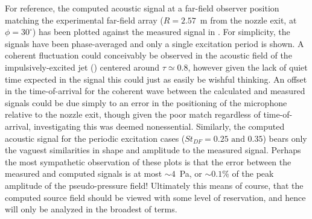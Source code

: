 For reference, the computed acoustic signal at a far-field observer position matching the experimental far-field array ($R = 2.57$~m from the nozzle exit, at $\phi = 30^\circ$) has been plotted against the measured signal in .
For simplicity, the signals have been phase-averaged and only a single excitation period is shown.
A coherent fluctuation could conceivably be observed in the acoustic field of the impulsively-excited jet () centered around $\tau \simeq 0.8$, however given the lack of quiet time expected in the signal this could just as easily be wishful thinking.
An offset in the time-of-arrival for the coherent wave between the calculated and measured signals could be due simply to an error in the positioning of the microphone relative to the nozzle exit, though given the poor match regardless of time-of-arrival, investigating this was deemed nonessential.
Similarly, the computed acoustic signal for the periodic excitation cases ($St_{DF} = 0.25 \text{ and } 0.35$) bears only the vaguest similarities in shape and amplitude to the measured signal.
Perhaps the most sympathetic observation of these plots is that the error between the measured and computed signals is at most $\sim 4$~Pa, or $\sim 0.1$\% of the peak amplitude of the pseudo-pressure field!
Ultimately this means of course, that the computed source field should be viewed with some level of reservation, and hence will only be analyzed in the broadest of terms.
